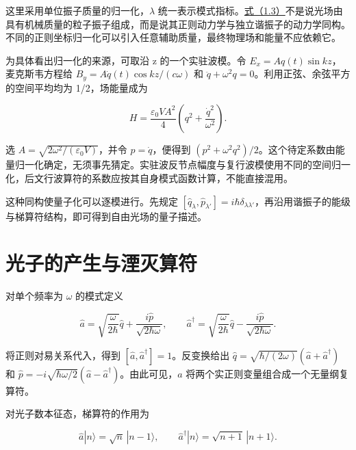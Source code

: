 \documentclass[UTF8,a4paper,zihao=-4,openany,fontset=fandol]{ctexbook}
\begin{document}
这里采用单位振子质量的归一化，$\lambda$ 统一表示模式指标。\hyperref[eq:1.3]{式（1.3）}不是说光场由具有机械质量的粒子振子组成，而是说其正则动力学与独立谐振子的动力学同构。不同的正则坐标归一化可以引入任意辅助质量，最终物理场和能量不应依赖它。



为具体看出归一化的来源，可取沿 z 的一个实驻波模。令 $E_x=Aq(t)\sin kz$，麦克斯韦方程给 $B_y=A\dot q(t)\cos kz/(c\omega)$ 和 $\ddot q+\omega^2q=0$。利用正弦、余弦平方的空间平均均为 1/2，场能量成为



\begin{equation*}
H=\frac{\varepsilon_0VA^2}{4}
\left(q^2+\frac{\dot q^2}{\omega^2}\right).
\tag{1.3a}\label{eq:1.3a}
\end{equation*}


选 $A=\sqrt{2\omega^2/(\varepsilon_0V)}$，并令 $p=\dot q$，便得到 $(p^2+\omega^2q^2)/2$。这个待定系数由能量归一化确定，无须事先猜定。实驻波反节点幅度与复行波模使用不同的空间归一化，后文行波算符的系数应按其自身模式函数计算，不能直接混用。



这种同构使量子化可以逐模进行。先规定 $[\hat q_\lambda,\hat p_{\lambda'}]=i\hbar\delta_{\lambda\lambda'}$，再沿用谐振子的能级与梯算符结构，即可得到自由光场的量子描述。



\section{光子的产生与湮灭算符}\label{sec:01:3}


对单个频率为 $\omega$ 的模式定义



\begin{equation*}
\hat a=\sqrt{\frac{\omega}{2\hbar}}\hat q
+\frac{i\hat p}{\sqrt{2\hbar\omega}},\qquad
\hat a^\dagger=\sqrt{\frac{\omega}{2\hbar}}\hat q
-\frac{i\hat p}{\sqrt{2\hbar\omega}}.
\tag{1.4}\label{eq:1.4}
\end{equation*}


将正则对易关系代入，得到 $[\hat a,\hat a^\dagger]=1$。反变换给出 $\hat q=\sqrt{\hbar/(2\omega)}(\hat a+\hat a^\dagger)$ 和 $\hat p=-i\sqrt{\hbar\omega/2}(\hat a-\hat a^\dagger)$。由此可见，$a$ 将两个实正则变量组合成一个无量纲复算符。



对光子数本征态，梯算符的作用为



\begin{equation*}
\hat a|n\rangle=\sqrt n\,|n-1\rangle,\qquad
\hat a^\dagger|n\rangle=\sqrt{n+1}\,|n+1\rangle.
\tag{1.5}\label{eq:1.5}
\end{equation*}
\end{document}
